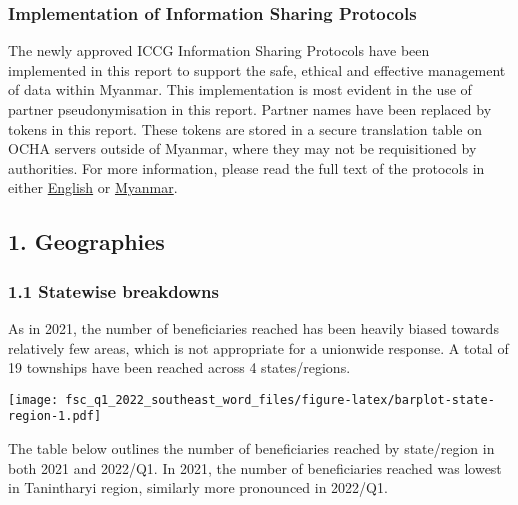 \documentclass[
]{article}
\begin{document}
\hypertarget{implementation-of-information-sharing-protocols}{%
\subsubsection{Implementation of Information Sharing
Protocols}\label{implementation-of-information-sharing-protocols}}

The newly approved ICCG Information Sharing Protocols have been
implemented in this report to support the safe, ethical and effective
management of data within Myanmar. This implementation is most evident
in the use of partner pseudonymisation in this report. Partner names
have been replaced by tokens in this report. These tokens are stored in
a secure translation table on OCHA servers outside of Myanmar, where
they may not be requisitioned by authorities. For more information,
please read the full text of the protocols in either
\href{https://www.dropbox.com/s/11kv6cvnbvx9hbe/information_sharing_protocol_220323.pdf?dl=0}{English}
or
\href{https://www.dropbox.com/s/lqwvo7k80s1xnjj/SE\%20partner\%20data\%20protection_final_220323\%20translation.pdf?dl=0}{Myanmar}.

\hypertarget{geographies}{%
\subsection{1. Geographies}\label{geographies}}

\hypertarget{statewise-breakdowns}{%
\subsubsection{1.1 Statewise breakdowns}\label{statewise-breakdowns}}

As in 2021, the number of beneficiaries reached has been heavily biased
towards relatively few areas, which is not appropriate for a unionwide
response. A total of 19 townships have been reached across 4
states/regions.

\texttt{[image: fsc\_q1\_2022\_southeast\_word\_files/figure-latex/barplot-state-region-1.pdf]}

The table below outlines the number of beneficiaries reached by
state/region in both 2021 and 2022/Q1. In 2021, the number of
beneficiaries reached was lowest in Tanintharyi region, similarly more
pronounced in 2022/Q1.
\end{document}
